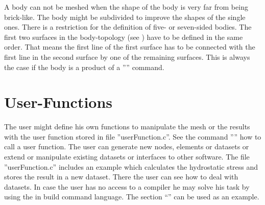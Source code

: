 \documentclass{article}
\begin{document}
A body can not be meshed when the shape of the body is very far from being brick-like. The body might be subdivided to improve the shapes of the single ones. There is a restriction for the definition of five- or seven-sided bodies. The first two surfaces in the body-topology (see ) have to be defined in the same order. That means the first line of the first surface has to be connected with the first line in the second surface by one of the remaining surfaces. This is always the case if the body is a product of a '''' command.

 \section{\label{User-Functions}User-Functions}
The user might define his own functions to manipulate the mesh or the results with the user function stored in file ''userFunction.c''. See the command '''' how to call a user function. The user can generate new nodes, elements or datasets or extend or manipulate existing datasets or interfaces to other software. The file ''userFunction.c'' includes an example which calculates the hydrostatic stress and stores the result in a new dataset. There the user can see how to deal with datasets. In case the user has no access to a compiler he may solve his task by using the in build command language. The section ``'' can be used as an example.
\end{document}
